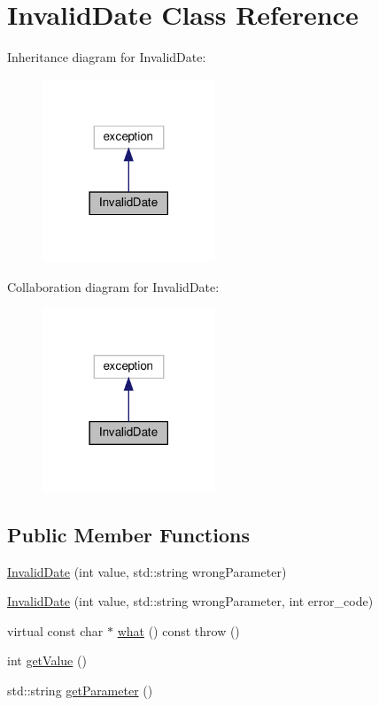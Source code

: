 \hypertarget{classInvalidDate}{}\section{Invalid\+Date Class Reference}
\label{classInvalidDate}


Inheritance diagram for Invalid\+Date\+:\nopagebreak
\begin{figure}[H]
\begin{center}
\leavevmode
\includegraphics[width=146pt]{classInvalidDate__inherit__graph}
\end{center}
\end{figure}


Collaboration diagram for Invalid\+Date\+:\nopagebreak
\begin{figure}[H]
\begin{center}
\leavevmode
\includegraphics[width=146pt]{classInvalidDate__coll__graph}
\end{center}
\end{figure}
\subsection*{Public Member Functions}
\begin{DoxyCompactItemize}
\item 
\hyperlink{classInvalidDate_aec0b6360cdfe3c61278ac5ff668dc946}{Invalid\+Date} (int value, std\+::string wrong\+Parameter)
\item 
\hyperlink{classInvalidDate_acd3b0f4629f51807bd95a7530642d8f3}{Invalid\+Date} (int value, std\+::string wrong\+Parameter, int error\+\_\+code)
\item 
virtual const char $\ast$ \hyperlink{classInvalidDate_ae3a017e8f670ebc051f4bbcb5edae47f}{what} () const  throw ()
\item 
int \hyperlink{classInvalidDate_af05b8106788ddffe0730431d14eb206f}{get\+Value} ()
\item 
std\+::string \hyperlink{classInvalidDate_ac88bde221f49a16107a7cea66e214819}{get\+Parameter} ()
\end{DoxyCompactItemize}


